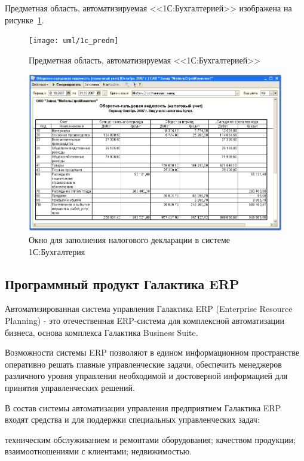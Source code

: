 \documentclass[14pt,a4paper]{reportmod}
\begin{document}
Предметная область, автоматизируемая <<1С:Бухгалтерией>> изображена на рисунке~\ref{pic:1c_image1}.


\begin{figure}
  \centering
  \texttt{[image: uml/1c\_predm]}
  \caption{Предметная область, автоматизируемая <<1С:Бухгалтерией>>}
  \label{pic:1c_image1}
\end{figure}


\begin{figure}
  \centering
  \includegraphics[scale=0.5]{pics/1c_image2}
  \caption{Окно для заполнения налогового декларации в системе 1С:Бухгалтерия}
  \label{pic:1c_image2}
\end{figure}
\subsection{Программный продукт Галактика ERP}
Автоматизированная система управления Галактика ERP (Enterprise Resource Planning) - это отечественная ERP-система для комплексной автоматизации бизнеса, основа комплекса Галактика Business Suite.


Возможности системы ERP позволяют в едином информационном пространстве оперативно решать главные управленческие задачи, обеспечить менеджеров различного уровня управления необходимой и достоверной информацией для принятия управленческих решений.


В состав системы автоматизации управления предприятием Галактика ERP входят средства и для поддержки специальных управленческих задач:
\begin{itemize}
   техническим обслуживанием и ремонтами оборудования;
   качеством продукции;
   взаимоотношениями с клиентами;
   недвижимостью.
\end{itemize}
\end{document}
